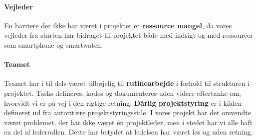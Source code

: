 \paragraph{Vejleder}
En barriere der ikke har været i projektet er \textbf{ressource mangel}, da vores vejleder fra starten har bidraget til projektet både med indsigt og med ressourcer som smartphone og smartwatch.

\paragraph{Teamet}
Teamet har i til dels været tilbøjelig til \textbf{rutinearbejde} i forhold til strukturen i projektet.
Tasks defineres, kodes og dokumenteres uden videre eftertanke om, hvorvidt vi er på vej i den rigtige retning.
\textbf{Dårlig projektstyring} er i kilden defineret ud fra autoritære projektstyringsstile.
I vores projekt har det omvendte været problemet, der har ikke været én projektleder, men i stedet har vi alle haft en del af lederrollen.
Dette har betydet at ledelsen har været løs og uden retning.